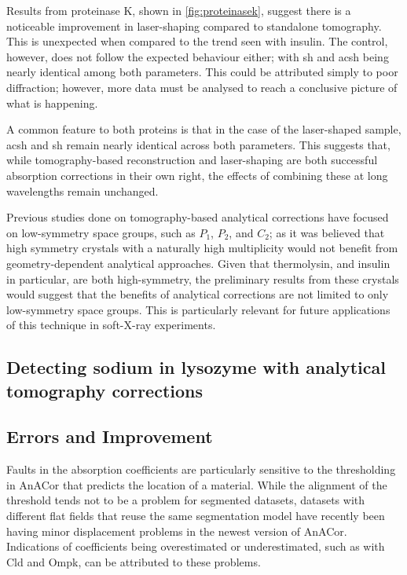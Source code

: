 Results from proteinase K, shown in \cref{fig:proteinasek}, suggest there is a noticeable improvement in laser-shaping compared to standalone tomography. This is unexpected when compared to the trend seen with insulin. The control, however, does not follow the expected behaviour either; with \ac{sh} and \ac{acsh} being nearly identical among both parameters. This could be attributed simply to poor diffraction; however, more data must be analysed to reach a conclusive picture of what is happening.

A common feature to both proteins is that in the case of the laser-shaped sample, \ac{acsh} and \ac{sh} remain nearly identical across both parameters.
This suggests that, while tomography-based reconstruction and laser-shaping are both successful absorption corrections in their own right, the effects of combining these at long wavelengths remain unchanged.

Previous studies done on tomography-based analytical corrections have focused on low-symmetry space groups, such as $P_1$, $P_2$, and $C_2$; as it was believed that high symmetry crystals with a naturally high multiplicity would not benefit from geometry-dependent analytical approaches. Given that thermolysin, and insulin in particular, are both high-symmetry, the preliminary results from these crystals would suggest that the benefits of analytical corrections are not limited to only low-symmetry space groups. This is particularly relevant for future applications of this technique in soft-X-ray experiments.



\subsection{Detecting sodium in lysozyme with analytical tomography corrections}


\subsection{Errors and Improvement}

Faults in the absorption coefficients are particularly sensitive to the thresholding in AnACor that predicts the location of a material. While the alignment of the threshold tends not to be a problem for segmented datasets, datasets with different flat fields that reuse the same segmentation model have recently been having minor displacement problems in the newest version of AnACor. Indications of coefficients being overestimated or underestimated, such as with Cld and Ompk, can be attributed to these problems.  

